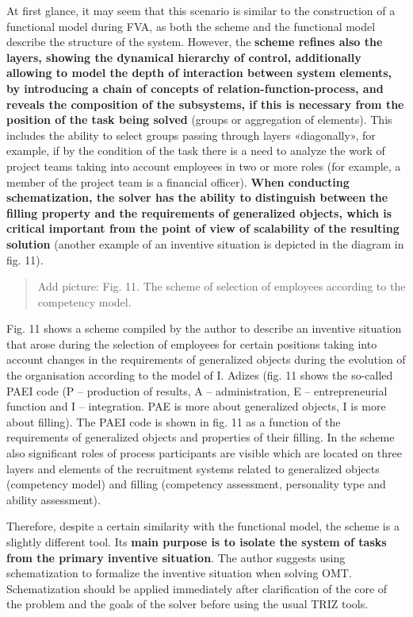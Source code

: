 \documentclass[11pt,a4paper]{book}
\newcommand{\addpicture}[1]{
  \begin{quote} Add picture: #1\end{quote}
}
\begin{document}
At first glance, it may seem that this scenario is similar to the construction
of a functional model during FVA, as both the scheme and the functional model
describe the structure of the system. However, the \textbf{scheme refines also
  the layers, showing the dynamical hierarchy of control, additionally
  allowing to model the depth of interaction between system elements, by
  introducing a chain of concepts of relation-function-process, and reveals
  the composition of the subsystems, if this is necessary from the position of
  the task being solved} (groups or aggregation of elements). This includes
the ability to select groups passing through layers «diagonally», for example,
if by the condition of the task there is a need to analyze the work of project
teams taking into account employees in two or more roles (for example, a
member of the project team is a financial officer). \textbf{When conducting
  schematization, the solver has the ability to distinguish between the
  filling property and the requirements of generalized objects, which is
  critical important from the point of view of scalability of the resulting
  solution} (another example of an inventive situation is depicted in the
diagram in fig. 11).

\addpicture{Fig. 11. The scheme of selection of employees according to the
  competency model.}

Fig. 11 shows a scheme compiled by the author to describe an inventive
situation that arose during the selection of employees for certain positions
taking into account changes in the requirements of generalized objects during
the evolution of the organisation according to the model of I. Adizes (fig. 11
shows the so-called PAEI code (P -- production of results, A --
administration, E -- entrepreneurial function and I -- integration. PAE is
more about generalized objects, I is more about filling). The PAEI code is
shown in fig. 11 as a function of the requirements of generalized objects and
properties of their filling.  In the scheme also significant roles of process
participants are visible which are located on three layers and elements of the
recruitment systems related to generalized objects (competency model) and
filling (competency assessment, personality type and ability assessment).

Therefore, despite a certain similarity with the functional model, the scheme
is a slightly different tool. Its \textbf{main purpose is to isolate the
  system of tasks from the primary inventive situation}. The author suggests
using schematization to formalize the inventive situation when solving OMT.
Schematization should be applied immediately after clarification of the core
of the problem and the goals of the solver before using the usual TRIZ tools.
\end{document}
